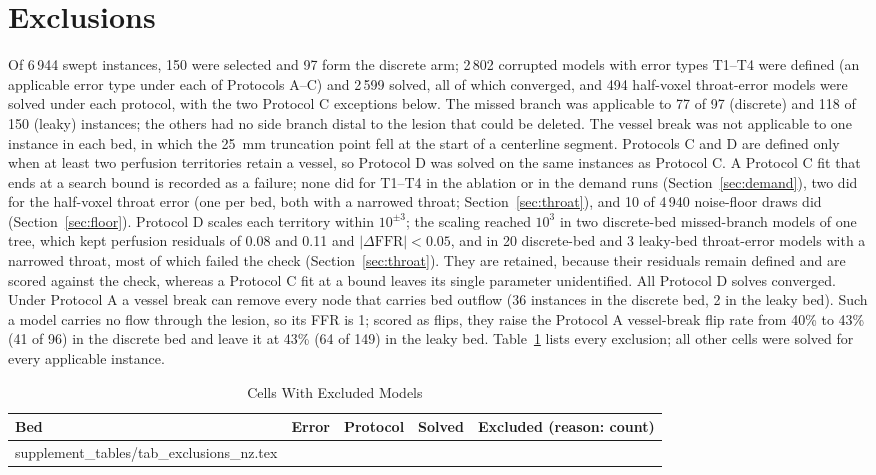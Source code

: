 \documentclass[journal,twoside,web,onecolumn]{ieeecolor}
\begin{document}
\section{Exclusions}
Of 6\,944 swept instances, 150 were selected and 97 form the discrete arm; 2\,802 corrupted models with error types T1--T4 were defined
(an applicable error type under each of Protocols A--C) and 2\,599 solved, all of which converged, and 494 half-voxel throat-error models were solved under each protocol, with the two Protocol C exceptions below. The missed branch was applicable to 77 of 97 (discrete) and 118 of 150 (leaky)
instances; the others had no side branch distal to the lesion that could be deleted. The vessel break was not
applicable to one instance in each bed, in which the 25~mm truncation point fell at the start of a centerline segment.
Protocols C and D are defined only when at least two perfusion territories retain a vessel, so Protocol D was solved on the same instances as Protocol C. A Protocol C fit that ends at a search bound
is recorded as a failure; none did for T1--T4 in the ablation or in the demand runs (Section~\ref{sec:demand}), two did for the half-voxel throat error (one per bed, both with a narrowed throat; Section~\ref{sec:throat}), and 10 of
4\,940 noise-floor draws did (Section~\ref{sec:floor}). Protocol D scales each territory within $10^{\pm 3}$; the
scaling reached $10^3$ in two discrete-bed missed-branch models of one tree, which kept perfusion residuals of 0.08 and
0.11 and $|\Delta\mathrm{FFR}| < 0.05$, and in 20 discrete-bed and 3 leaky-bed throat-error models with a narrowed throat, most of which failed the check (Section~\ref{sec:throat}). They are retained, because their residuals remain defined and are scored against the check, whereas a Protocol C fit at a bound leaves its single parameter unidentified. All Protocol D solves converged. Under Protocol A a vessel break can remove every node that
carries bed outflow (36 instances in the discrete bed, 2 in the leaky bed). Such a model carries no flow through the lesion, so its FFR is 1; scored as flips, they raise the Protocol A vessel-break flip rate from 40\% to 43\% (41 of 96) in the discrete bed and leave it at 43\% (64 of 149) in the leaky bed. Table~\ref{tab:excl} lists every
exclusion; all other cells were solved for every applicable instance.
\begin{table}[!ht]
\caption{Cells With Excluded Models}\label{tab:excl}
\centering\small
\begin{tabular}{@{}lllrl@{}}
\toprule
Bed & Error & Protocol & Solved & Excluded (reason: count)\\
\midrule
{} supplement_tables/tab_exclusions_nz.tex 
\bottomrule
\end{tabular}
\end{table}
\end{document}
